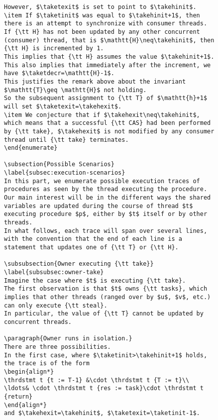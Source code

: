 \documentclass[a4paper]{article}
\begin{document}
{\begin{figure}
\begin{lstlisting}
However, $\taketexit$ is set to point to $\takehinit$.
\item If $\taketinit$ was equal to $\takehinit+1$, then there is an attempt to synchronize with consumer threads.
If {\tt H} has not been updated by any other concurrent (consumer) thread, that is $\mathtt{H}\neq\takehinit$, then {\tt H} is incremented by 1.
This implies that {\tt H} assumes the value $\takehinit+1$.
This also implies that immediately after the increment, we have $\taketdecr=\mathtt{H}-1$. 
This justifies the remark above about the invariant $\mathtt{T}\geq \mathtt{H}$ not holding.
So the subsequent assignment to {\tt T} of $\mathtt{h}+1$ will set $\taketexit=\takehexit$. 
\item We conjecture that if $\takehexit\neq\takehinit$, which means that a successful {\tt CAS} had been performed by {\tt take}, $\takehexit$ is not modified by any consumer thread until {\tt take} terminates.
\end{enumerate}

\subsection{Possible Scenarios}
\label{subsec:execution-scenarios}
In this part, we enumerate possible execution traces of procedures as seen by the thread executing the procedure.
Our main interest will be in the different ways the shared variables are updated during the course of thread $t$ executing procedure $p$, either by $t$ itself or by other threads.
In what follows, each trace will span over several lines, with the convention that the end of each line is a statement that updates one of {\tt T} or {\tt H}.

\subsubsection{Owner executing {\tt take}}
\label{subsubsec:owner-take}
Imagine the case where $t$ is executing {\tt take}. 
The first observation is that $t$ owns {\tt tasks}, which implies that other threads (ranged over by $u$, $v$, etc.) can only execute {\tt steal}.
In particular, the value of {\tt T} cannot be updated by concurrent threads.

\paragraph{Owner runs in isolation.}
There are three possibilities.
In the first case, where $\taketinit>\takehinit+1$ holds, the trace is of the form 
\begin{align*}
\thrdstmt t {t := T-1} &\cdot \thrdstmt t {T := t}\\
\ldots& \cdot \thrdstmt t {res := task}\cdot \thrdstmt t {return}
\end{align*}
and $\takehexit=\takehinit$, $\taketexit=\taketinit-1$.


\end{lstlisting}
\end{figure}}
\end{document}
